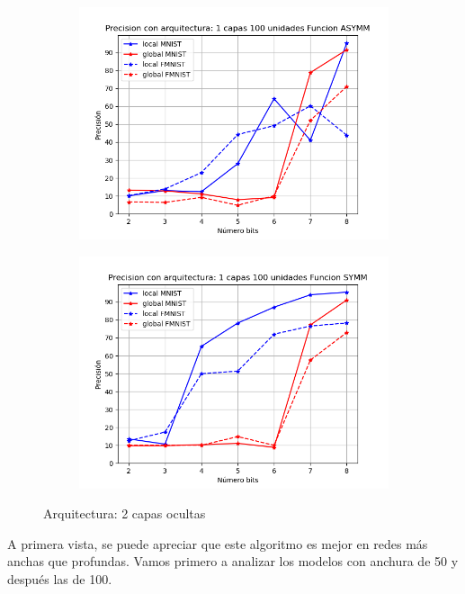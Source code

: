 \begin{figure}[H]
\begin{subfigure}[H]{0.475\textwidth}
    \includegraphics[width=\textwidth]{imagenes/fa/Precision con arquitectura: 1 capas 100 unidades Funcion ASYMM.png}
    \end{subfigure}
    \begin{subfigure}[H]{0.475\textwidth}
    \includegraphics[width=\textwidth]{imagenes/fa/Precision con arquitectura: 1 capas 100 unidades Funcion SYMM.png}
    \end{subfigure}
    \caption{Arquitectura: 2 capas ocultas}
\end{figure}

A primera vista, se puede apreciar que este algoritmo es mejor en redes más anchas que profundas. Vamos primero a analizar los modelos con anchura de 50 y después las de 100.


